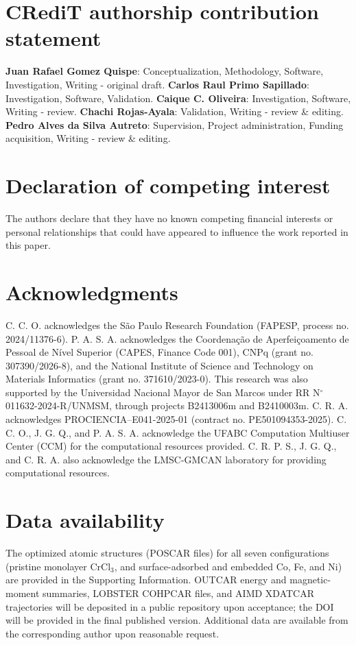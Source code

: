\documentclass[journal=jacsat,manuscript=article]{achemso}
\begin{document}
\section*{CRediT authorship contribution statement}
\begin{sloppypar}
  \textbf{Juan Rafael Gomez Quispe}: Conceptualization, Methodology, Software, Investigation, Writing - original draft. \textbf{Carlos Raul Primo Sapillado}: Investigation, Software, Validation. \textbf{Caique C. Oliveira}: Investigation, Software, Writing - review. \textbf{Chachi Rojas-Ayala}: Validation, Writing - review \& editing. \textbf{Pedro Alves da Silva Autreto}: Supervision, Project administration, Funding acquisition, Writing - review \& editing.
\end{sloppypar}

\section*{Declaration of competing interest}
The authors declare that they have no known competing financial interests or personal relationships that could have appeared to influence the work reported in this paper.

\section*{Acknowledgments}

C. C. O. acknowledges the S\~ao Paulo Research Foundation (FAPESP, process no. 2024/11376-6). P. A. S. A. acknowledges the Coordena\c{c}\~ao de Aperfei\c{c}oamento de Pessoal de N\'ivel Superior (CAPES, Finance Code 001), CNPq (grant no. 307390/2026-8), and the National Institute of Science and Technology on Materials Informatics (grant no. 371610/2023-0). This research was also supported by the Universidad Nacional Mayor de San Marcos under RR N$^\circ$ 011632-2024-R/UNMSM, through projects B2413006m and B2410003m. C. R. A. acknowledges PROCIENCIA--E041-2025-01 (contract no. PE501094353-2025). C. C. O., J. G. Q., and P. A. S. A. acknowledge the UFABC Computation Multiuser Center (CCM) for the computational resources provided. C. R. P. S., J. G. Q., and C. R. A. also acknowledge the LMSC-GMCAN laboratory for providing computational resources.

\section*{Data availability}

The optimized atomic structures (POSCAR files) for all seven configurations (pristine monolayer CrCl$_3$, and surface-adsorbed and embedded Co, Fe, and Ni) are provided in the Supporting Information. OUTCAR energy and magnetic-moment summaries, LOBSTER COHPCAR files, and AIMD XDATCAR trajectories will be deposited in a public repository upon acceptance; the DOI will be provided in the final published version. Additional data are available from the corresponding author upon reasonable request.


\end{document}
